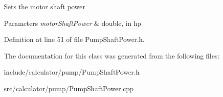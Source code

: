 Sets the motor shaft power 
\begin{DoxyParams}{Parameters}
{\em motor\+Shaft\+Power} & double, in hp \\
\hline
\end{DoxyParams}


Definition at line 51 of file Pump\+Shaft\+Power.\+h.



The documentation for this class was generated from the following files\+:\begin{DoxyCompactItemize}
\item 
include/calculator/pump/Pump\+Shaft\+Power.\+h\item 
src/calculator/pump/Pump\+Shaft\+Power.\+cpp\end{DoxyCompactItemize}
